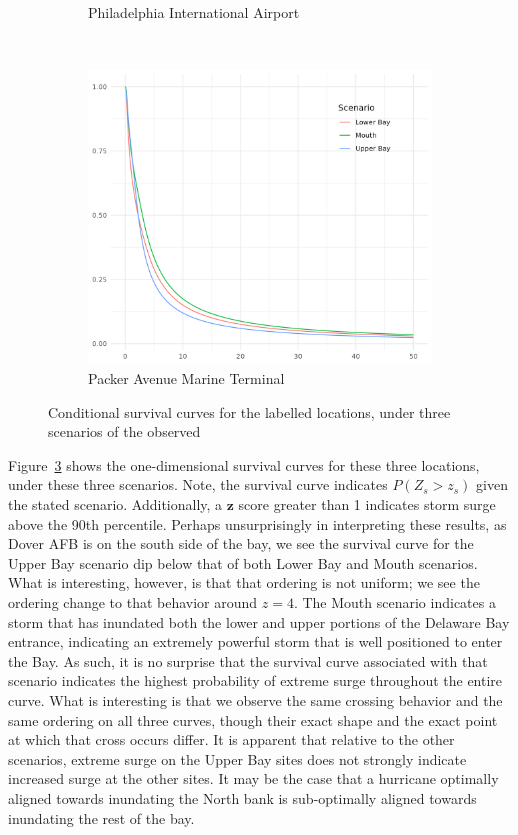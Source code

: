 \begin{figure}[htb]
\begin{subfigure}[t]{0.31\textwidth}
        \caption{Philadelphia International Airport\label{fig:condsurv1d:pia}}
    \end{subfigure}%
    ~
    \begin{subfigure}[t]{0.31\textwidth}
        \centering
        \includegraphics[width=\linewidth]{./plots/condsurv/packerave}
        \caption{Packer Avenue Marine Terminal\label{fig:condsurv1d:packerave}}
    \end{subfigure}
    \caption{Conditional survival curves for the labelled locations, under three scenarios of the observed \label{fig:condsurv1d}}
\end{figure}

Figure~\ref{fig:condsurv1d} shows the one-dimensional survival curves for these three locations, under 
    these three scenarios.  Note, the survival curve indicates $P(Z_s > z_s)$ given the stated scenario.
    Additionally, a $\bm{z}$ score greater than 1 indicates storm surge above the 90th percentile.
    Perhaps unsurprisingly in interpreting these results, as Dover AFB is on the south side of the bay, 
    we see the survival curve for the Upper Bay scenario dip below that of both Lower Bay and Mouth scenarios.  
    What is interesting, however, is that that ordering is not uniform; we see the ordering change to that
    behavior around $z = 4$.  The Mouth scenario indicates a storm that has inundated both the lower and
    upper portions of the Delaware Bay entrance, indicating an extremely powerful storm that is well positioned
    to enter the Bay.  As such, it is no surprise that the survival curve associated with that scenario
    indicates the highest probability of extreme surge throughout the entire curve.  What is interesting is that
    we observe the same crossing behavior and the same ordering on all three curves, though their exact shape
    and the exact point at which that cross occurs differ.  It is apparent that relative to the other
    scenarios, extreme surge on the Upper Bay sites does not strongly indicate increased surge at the other 
    sites.  It may be the case that a hurricane optimally aligned towards inundating the North bank is 
    sub-optimally aligned towards inundating the rest of the bay.

